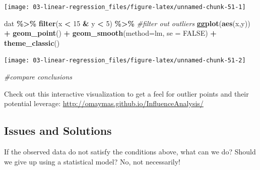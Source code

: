 \documentclass[
]{book}
\newenvironment{Shaded}{\begin{snugshade}}{\end{snugshade}}
\newcommand{\AttributeTok}[1]{\textcolor[rgb]{0.13,0.29,0.53}{#1}}
\newcommand{\CommentTok}[1]{\textcolor[rgb]{0.56,0.35,0.01}{\textit{#1}}}
\newcommand{\ConstantTok}[1]{\textcolor[rgb]{0.56,0.35,0.01}{#1}}
\newcommand{\DecValTok}[1]{\textcolor[rgb]{0.00,0.00,0.81}{#1}}
\newcommand{\FunctionTok}[1]{\textcolor[rgb]{0.13,0.29,0.53}{\textbf{#1}}}
\newcommand{\NormalTok}[1]{#1}
\newcommand{\SpecialCharTok}[1]{\textcolor[rgb]{0.81,0.36,0.00}{\textbf{#1}}}
\newcommand{\StringTok}[1]{\textcolor[rgb]{0.31,0.60,0.02}{#1}}
\begin{document}
\begin{center}\texttt{[image: 03-linear-regression\_files/figure-latex/unnamed-chunk-51-1]} \end{center}

\begin{Shaded}
\begin{Highlighting}[]
\NormalTok{dat }\SpecialCharTok{\%\textgreater{}\%}
  \FunctionTok{filter}\NormalTok{(x }\SpecialCharTok{\textless{}} \DecValTok{15} \SpecialCharTok{\&}\NormalTok{ y }\SpecialCharTok{\textless{}} \DecValTok{5}\NormalTok{) }\SpecialCharTok{\%\textgreater{}\%} \CommentTok{\#filter out outliers}
  \FunctionTok{ggplot}\NormalTok{(}\FunctionTok{aes}\NormalTok{(x,y)) }\SpecialCharTok{+} 
  \FunctionTok{geom\_point}\NormalTok{() }\SpecialCharTok{+} 
  \FunctionTok{geom\_smooth}\NormalTok{(}\AttributeTok{method=}\StringTok{\textquotesingle{}lm\textquotesingle{}}\NormalTok{, }\AttributeTok{se =} \ConstantTok{FALSE}\NormalTok{) }\SpecialCharTok{+} 
  \FunctionTok{theme\_classic}\NormalTok{() }
\end{Highlighting}
\end{Shaded}

\begin{center}\texttt{[image: 03-linear-regression\_files/figure-latex/unnamed-chunk-51-2]} \end{center}

\begin{Shaded}
\begin{Highlighting}[]
\CommentTok{\#compare conclusions}
\end{Highlighting}
\end{Shaded}

Check out this interactive visualization to get a feel for outlier points and their potential leverage: \url{http://omaymas.github.io/InfluenceAnalysis/}

\subsection{Issues and Solutions}\label{issues-and-solutions}

If the observed data do not satisfy the conditions above, what can we do? Should we give up using a statistical model? No, not necessarily!
\end{document}
